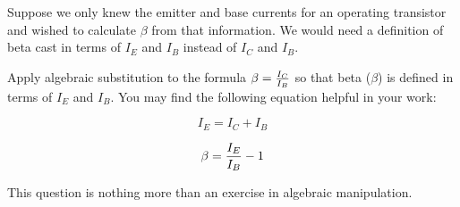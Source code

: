 

Suppose we only knew the emitter and base currents for an operating transistor and wished to calculate $\beta$ from that information.  We would need a definition of beta cast in terms of $I_E$ and $I_B$ instead of $I_C$ and $I_B$.

Apply algebraic substitution to the formula $\beta = {I_C \over I_B}$ so that beta ($\beta$) is defined in terms of $I_E$ and $I_B$.  You may find the following equation helpful in your work:

$$I_E = I_C + I_B$$







$$\beta = {I_E \over I_B} - 1$$







This question is nothing more than an exercise in algebraic manipulation.





